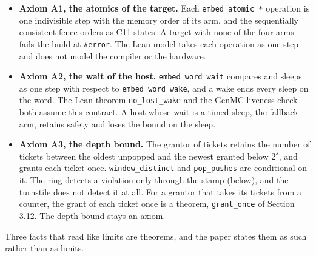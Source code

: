 \begin{itemize}
\item \textbf{Axiom A1, the atomics of the target.} Each \texttt{embed\_\allowbreak{}atomic\_\allowbreak{}*} operation is one indivisible step with the memory order of its arm, and the sequentially consistent fence orders as C11 states. A target with none of the four arms fails the build at \texttt{\#error}. The Lean model takes each operation as one step and does not model the compiler or the hardware.
\item \textbf{Axiom A2, the wait of the host.} \texttt{embed\_\allowbreak{}word\_\allowbreak{}wait} compares and sleeps as one step with respect to \texttt{embed\_\allowbreak{}word\_\allowbreak{}wake}, and a wake ends every sleep on the word. The Lean theorem \texttt{no\_\allowbreak{}lost\_\allowbreak{}wake} and the GenMC liveness check both assume this contract. A host whose wait is a timed sleep, the fallback arm, retains safety and loses the bound on the sleep.
\item \textbf{Axiom A3, the depth bound.} The grantor of tickets retains the number of tickets between the oldest unpopped and the newest granted below \(2^{s}\), and grants each ticket once. \texttt{window\_\allowbreak{}distinct} and \texttt{pop\_\allowbreak{}pushes} are conditional on it. The ring detects a violation only through the stamp (below), and the turnstile does not detect it at all. For a grantor that takes its tickets from a counter, the grant of each ticket once is a theorem, \texttt{grant\_\allowbreak{}once} of Section 3.12. The depth bound stays an axiom.
\end{itemize}

Three facts that read like limits are theorems, and the paper states them as such rather than as limits.

